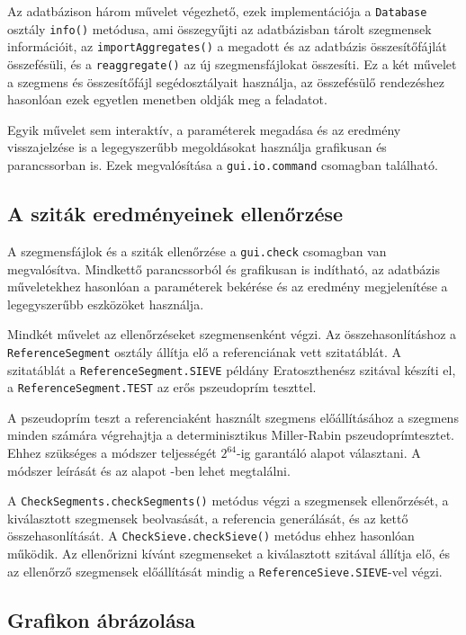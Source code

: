 Az adatbázison három művelet végezhető, ezek implementációja a \texttt{Database} osztály \texttt{info()} metódusa, ami összegyűjti az adatbázisban tárolt szegmensek információit, az \texttt{importAggregates()} a megadott és az adatbázis összesítőfájlát összefésüli, és a \texttt{reaggregate()} az új szegmensfájlokat összesíti.
Ez a két művelet a szegmens és összesítőfájl segédosztályait használja, az összefésülő rendezéshez hasonlóan ezek egyetlen menetben oldják meg a feladatot.

Egyik művelet sem interaktív, a paraméterek megadása és az eredmény visszajelzése is a legegyszerűbb megoldásokat használja grafikusan és parancssorban is.
Ezek megvalósítása a \texttt{gui.io.command} csomagban található.

\subsection{A sziták eredményeinek ellenőrzése}

A szegmensfájlok és a sziták ellenőrzése a \texttt{gui.check} csomagban van megvalósítva.
Mindkettő parancssorból és grafikusan is indítható, az adatbázis műveletekhez hasonlóan a paraméterek bekérése és az eredmény megjelenítése a legegyszerűbb eszközöket használja.

Mindkét művelet az ellenőrzéseket szegmensenként végzi.
Az összehasonlításhoz a \texttt{ReferenceSegment} osztály állítja elő a referenciának vett szitatáblát.
A szitatáblát a \texttt{ReferenceSegment.SIEVE} példány Eratoszthenész szitával készíti el, a \texttt{ReferenceSegment.TEST} az erős pszeudoprím teszttel.

A pszeudoprím teszt a referenciaként használt szegmens előállításához a szegmens minden számára végrehajtja a determinisztikus Miller-Rabin pszeudoprímtesztet.
Ehhez szükséges a módszer teljességét $2^{64}$-ig garantáló alapot választani.
A módszer leírását és az alapot \cite{pseudoprimebase}-ben lehet megtalálni.

A \texttt{CheckSegments.checkSegments()} metódus végzi a szegmensek ellenőrzését, a kiválasztott szegmensek beolvasását, a referencia generálását, és az kettő összehasonlítását.
A \texttt{CheckSieve.checkSieve()} metódus ehhez hasonlóan működik.
Az ellenőrizni kívánt szegmenseket a kiválasztott szitával állítja elő, és az ellenőrző szegmensek előállítását mindig a \texttt{ReferenceSieve.SIEVE}-vel végzi.

\subsection{Grafikon ábrázolása}

